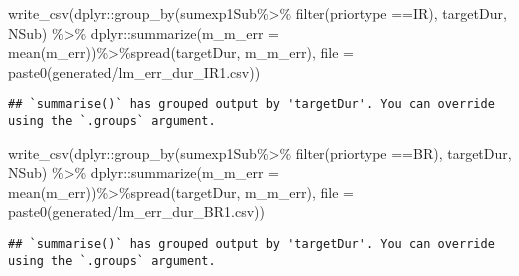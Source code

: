 \documentclass[
]{article}
\newenvironment{Shaded}{\begin{snugshade}}{\end{snugshade}}
\newcommand{\AttributeTok}[1]{\textcolor[rgb]{0.77,0.63,0.00}{#1}}
\newcommand{\FunctionTok}[1]{\textcolor[rgb]{0.00,0.00,0.00}{#1}}
\newcommand{\NormalTok}[1]{#1}
\newcommand{\SpecialCharTok}[1]{\textcolor[rgb]{0.00,0.00,0.00}{#1}}
\newcommand{\StringTok}[1]{\textcolor[rgb]{0.31,0.60,0.02}{#1}}
\begin{document}
\begin{Shaded}
\begin{Highlighting}[]
\FunctionTok{write\_csv}\NormalTok{(dplyr}\SpecialCharTok{::}\FunctionTok{group\_by}\NormalTok{(sumexp1Sub}\SpecialCharTok{\%\textgreater{}\%} \FunctionTok{filter}\NormalTok{(priortype }\SpecialCharTok{==}\StringTok{\textquotesingle{}IR\textquotesingle{}}\NormalTok{), targetDur, NSub) }\SpecialCharTok{\%\textgreater{}\%}
\NormalTok{  dplyr}\SpecialCharTok{::}\FunctionTok{summarize}\NormalTok{(}\AttributeTok{m\_m\_err =} \FunctionTok{mean}\NormalTok{(m\_err))}\SpecialCharTok{\%\textgreater{}\%}\FunctionTok{spread}\NormalTok{(targetDur, m\_m\_err), }\AttributeTok{file =} \FunctionTok{paste0}\NormalTok{(}\StringTok{\textquotesingle{}generated/lm\_err\_dur\_IR1.csv\textquotesingle{}}\NormalTok{))}
\end{Highlighting}
\end{Shaded}

\begin{verbatim}
## `summarise()` has grouped output by 'targetDur'. You can override using the `.groups` argument.
\end{verbatim}

\begin{Shaded}
\begin{Highlighting}[]
\FunctionTok{write\_csv}\NormalTok{(dplyr}\SpecialCharTok{::}\FunctionTok{group\_by}\NormalTok{(sumexp1Sub}\SpecialCharTok{\%\textgreater{}\%} \FunctionTok{filter}\NormalTok{(priortype }\SpecialCharTok{==}\StringTok{\textquotesingle{}BR\textquotesingle{}}\NormalTok{), targetDur, NSub) }\SpecialCharTok{\%\textgreater{}\%}
\NormalTok{  dplyr}\SpecialCharTok{::}\FunctionTok{summarize}\NormalTok{(}\AttributeTok{m\_m\_err =} \FunctionTok{mean}\NormalTok{(m\_err))}\SpecialCharTok{\%\textgreater{}\%}\FunctionTok{spread}\NormalTok{(targetDur, m\_m\_err), }\AttributeTok{file =} \FunctionTok{paste0}\NormalTok{(}\StringTok{\textquotesingle{}generated/lm\_err\_dur\_BR1.csv\textquotesingle{}}\NormalTok{))}
\end{Highlighting}
\end{Shaded}

\begin{verbatim}
## `summarise()` has grouped output by 'targetDur'. You can override using the `.groups` argument.
\end{verbatim}
\end{document}
